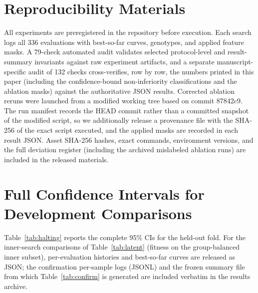 \documentclass[11pt]{article}
\begin{document}


\appendix

\section{Reproducibility Materials}
All experiments are preregistered in the repository before execution. Each search logs all 336 evaluations with best-so-far curves, genotypes, and applied feature masks. A 79-check automated audit validates selected protocol-level and result-summary invariants against raw experiment artifacts, and a separate manuscript-specific audit of 132 checks cross-verifies, row by row, the numbers printed in this paper (including the confidence-bound non-inferiority classifications and the ablation masks) against the authoritative JSON results. Corrected ablation reruns were launched from a modified working tree based on commit 87842c9. The run manifest records the HEAD commit rather than a committed snapshot of the modified script, so we additionally release a provenance file with the SHA-256 of the exact script executed, and the applied masks are recorded in each result JSON. Asset SHA-256 hashes, exact commands, environment versions, and the full deviation register (including the archived mislabeled ablation runs) are included in the released materials.
\section{Full Confidence Intervals for Development Comparisons}
Table~\ref{tab:halting} reports the complete 95\% CIs for the held-out fold. For the inner-search comparisons of Table~\ref{tab:latent} (fitness on the group-balanced inner subset), per-evaluation histories and best-so-far curves are released as JSON; the confirmation per-sample logs (JSONL) and the frozen summary file from which Table~\ref{tab:confirm} is generated are included verbatim in the results archive.
\end{document}

